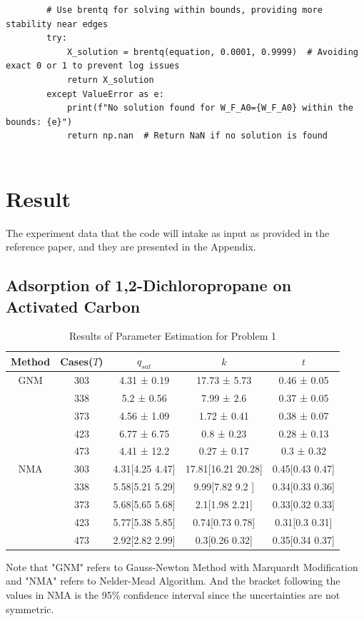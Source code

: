 \documentclass[12pt]{article} %
\begin{document}
\begin{enumerate}
\begin{lstlisting}
        # Use brentq for solving within bounds, providing more stability near edges
        try:
            X_solution = brentq(equation, 0.0001, 0.9999)  # Avoiding exact 0 or 1 to prevent log issues
            return X_solution
        except ValueError as e:
            print(f"No solution found for W_F_A0={W_F_A0} within the bounds: {e}")
            return np.nan  # Return NaN if no solution is found
    
    \end{lstlisting}
\end{enumerate}

\newpage
\section{Result}
The experiment data that the code will intake as input as provided in the reference paper, and they are presented in the Appendix.
\subsection{ Adsorption of 1,2-Dichloropropane on Activated Carbon}
\begin{table}[ht]
    \caption{Results of Parameter Estimation for Problem 1}
    \centering
    \begin{tabular}{|c|c|c|c|c|}
    \hline
Method & Cases($T$) &$q_{sat}$  & $k$ & $t$\\ \hline
GNM & 303 &4.31 ± 0.19& 17.73 ± 5.73& 0.46 ± 0.05\\
& 338 &5.2 ± 0.56& 7.99 ± 2.6& 0.37 ± 0.05\\
& 373 &4.56 ± 1.09& 1.72 ± 0.41& 0.38 ± 0.07\\
& 423 &6.77 ± 6.75& 0.8 ± 0.23& 0.28 ± 0.13\\
& 473 &4.41 ± 12.2& 0.27 ± 0.17& 0.3 ± 0.32\\ \hline
NMA & 303 &4.31[4.25  4.47]& 17.81[16.21 20.28]& 0.45[0.43  0.47]\\
& 338 &5.58[5.21 5.29]& 9.99[7.82 9.2 ]& 0.34[0.33 0.36]\\
& 373 &5.68[5.65 5.68]& 2.1[1.98 2.21]& 0.33[0.32 0.33]\\
& 423 &5.77[5.38 5.85]& 0.74[0.73 0.78]& 0.31[0.3  0.31]\\
& 473 &2.92[2.82 2.99]& 0.3[0.26 0.32]& 0.35[0.34 0.37]\\\hline
\end{tabular}
\label{tab:iteration_details}
\end{table}
Note that "GNM" refers to Gauss-Newton Method with Marquardt Modification and "NMA" refers to Nelder-Mead Algorithm.
And the bracket following the values in NMA is the 95\% confidence interval since the uncertainties are not symmetric.
\end{document}
